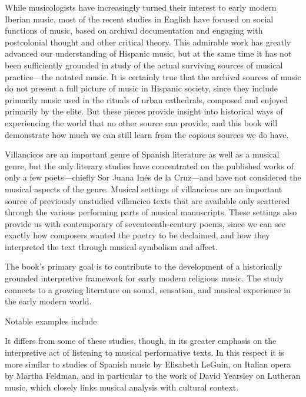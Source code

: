 \documentclass{vcbook-proposal}
\begin{document}
While musicologists have increasingly turned their interest to early modern 
Iberian music, most of the recent studies in English have focused on social 
functions of music, based on archival documentation and engaging with 
postcolonial thought and other critical theory.
This admirable work has greatly advanced our understanding of Hispanic music, 
but at the same time it has not been sufficiently grounded in study of the 
actual surviving sources of musical practice---the notated music.%
  \autocites{Torrente:PhD}{Baker:Harmony}{Irving:Colonial}
  {BakerKnighton:MusicUrbanSociety}
It is certainly true that the archival sources of music do not present a full 
picture of music in Hispanic society, since they include primarily music used 
in the rituals of urban cathedrals, composed and enjoyed primarily by the elite.
But these pieces provide insight into historical ways of experiencing the world 
that no other source can provide; and this book will demonstrate how much we 
can still learn from the copious sources we do have.

Villancicos are an important genre of Spanish literature as well as a musical 
genre, but the only literary studies have concentrated on the published works 
of only a few poets---chiefly Sor Juana Inés de la Cruz---and have not 
considered the musical aspects of the genre.%
  \autocite{Tenorio:SorJuana}
Musical settings of villancicos are an important source of previously unstudied 
villancico texts that are available only scattered through the various 
performing parts of musical manuscripts.
These settings also provide us with contemporary  of 
seventeenth-century poems, since we can see exactly how composers wanted the 
poetry to be declaimed, and how they interpreted the text through musical 
symbolism and affect.

The book's primary goal is to contribute to the development of a historically 
grounded interpretive framework for early modern religious music.
The study connects to a growing literature on sound, sensation, and musical 
experience in the early modern world.%
  \begin{Footnote}
  Notable examples include \autocites{Rath:EarlyAmerica}{Feldman:Passions}
  {Austern:Nature}{Gouk:MusicScienceMagic}
  \end{Footnote}
It differs from some of these studies, though, in its greater emphasis on the 
interpretive act of listening to musical performative texts.
In this respect it is more similar to studies of Spanish music by Elisabeth 
LeGuin, on Italian opera by Martha Feldman, and in particular to the work of 
David Yearsley on Lutheran music, which closely links musical analysis with 
cultural context.%
  \autocites{LeGuin:Tonadilla}{LeGuin:BoccheriniBody}
  {Feldman:Opera}{Yearsley:BachCounterpoint}
\end{document}
